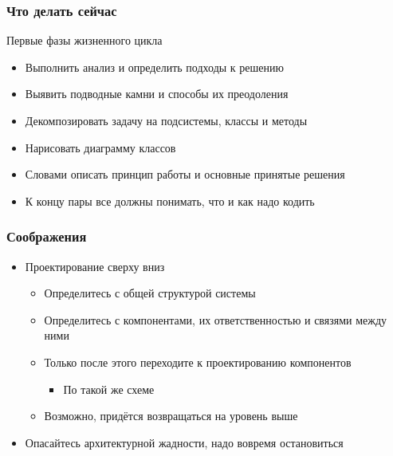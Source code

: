 \documentclass[xetex,mathserif,serif]{beamer}
\begin{document}
	\begin{frame}
		\frametitle{Что делать сейчас}
		Первые фазы жизненного цикла
		\begin{itemize}
			\item Выполнить анализ и определить подходы к решению
			\item Выявить подводные камни и способы их преодоления
			\item Декомпозировать задачу на подсистемы, классы и методы
			\item Нарисовать диаграмму классов
			\item Словами описать принцип работы и основные принятые решения
			\item К концу пары все должны понимать, что и как надо кодить
		\end{itemize}
	\end{frame}

	\begin{frame}
		\frametitle{Соображения}
		\begin{itemize}
			\item Проектирование сверху вниз
			\begin{itemize}
				\item Определитесь с общей структурой системы
				\item Определитесь с компонентами, их ответственностью и связями между ними
				\item Только после этого переходите к проектированию компонентов
				\begin{itemize}
					\item По такой же схеме
				\end{itemize}
				\item Возможно, придётся возвращаться на уровень выше
			\end{itemize}
			\item Опасайтесь архитектурной жадности, надо вовремя остановиться
		\end{itemize}
	\end{frame}

\end{document}
